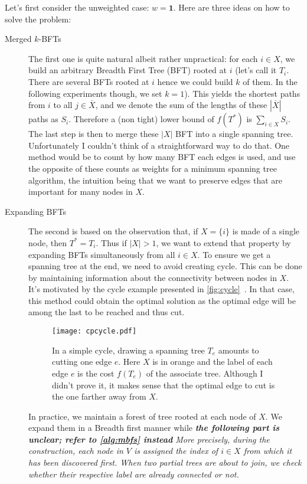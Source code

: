 \documentclass[a4paper,draft,notitlepage,11pt,svgnames]{scrartcl}
\newcommand{\stcomp}[1]{\ensuremath{\overline{#1}}}
\begin{document}
Let's first consider the unweighted case: $w=\boldsymbol{1}$. Here are three
ideas on how to solve the problem:
\begin{description}

	\item[Merged $k$-BFTs] The first one is quite natural albeit rather
		unpractical: for each $i \in X$, we build an arbitrary Breadth First
		Tree (BFT) rooted at $i$ (let's call it $T_i$. There are several BFTs
		rooted at $i$ hence we could build $k$ of them. In the following
		experiments though, we set $k=1$). This yields the shortest paths from
		$i$ to all $j \in \stcomp{X}$, and we denote the sum of the lengths of
		these $|\stcomp{X}|$ paths as $S_i$. Therefore a (non tight) lower
		bound of $f(T^*)$ is $\sum_{i\in X} S_i$. The last step is then to
		merge these $|X|$ BFT into a single spanning tree. Unfortunately I
		couldn't think of a straightforward way to do that. One method would be
		to count by how many BFT each edges is used, and use the opposite of
		these counts as weights for a minimum spanning tree algorithm, the
		intuition being that we want to preserve edges that are important for
		many nodes in $X$.

	\item[Expanding BFTs] The second is based on the observation that, if $X =
		\{i\}$ is made of a single node, then $T^* = T_i$. Thus if $|X| > 1$,
		we want to extend that property by expanding BFTs simultaneously from
		all $i \in X$. To ensure we get a spanning tree at the end, we need to
		avoid creating cycle. This can be done by maintaining information about
		the connectivity between nodes in $X$. It's motivated by the cycle
		example presented in \autoref{fig:cycle}~. In that
		case, this method could obtain the optimal solution as the optimal edge
		will be among the last to be reached and thus cut.

		\begin{figure}[hbp]
			\centering
			\texttt{[image: cpcycle.pdf]}
			\caption{In a simple cycle, drawing a spanning tree $T_e$ amounts
				to cutting one edge $e$. Here $X$ is in orange and the label of
				each edge $e$ is the cost $f(T_e)$ of the associate tree.
				Although I didn't prove it, it makes sense that the
				optimal edge to cut is the one farther away from $X$. \label{fig:cycle}}
		\end{figure}

		In practice, we maintain a forest of tree rooted at each node of $X$.
		We expand them in a Breadth first manner while 
		\emph{\textbf{the following part is unclear; refer to
		\autoref{alg:mbfs}  instead} More precisely, during the
		construction, each node in $V$ is assigned the index of $i \in X$ from
		which it has been discovered first. When two partial trees are about to
		join, we check whether their respective label are already connected or not.}


\end{description}
\end{document}
